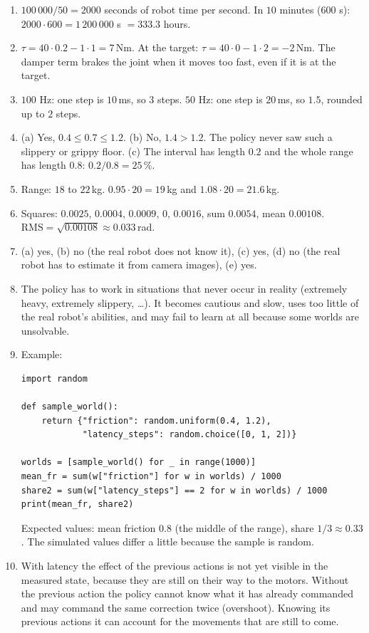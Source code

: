 \begin{enumerate}[label=\textbf{\ansnum.\arabic*}]
  \item $100\,000/50=2000$ seconds of robot time per second. In $10$ minutes ($600$ s): $2000\cdot600=1\,200\,000$ s $=333.3$ hours.
  \item $\tau=40\cdot0.2-1\cdot1=7$\,Nm. At the target: $\tau=40\cdot0-1\cdot2=-2$\,Nm. The damper term brakes the joint when it moves too fast, even if it is at the target.
  \item $100$ Hz: one step is $10$\,ms, so $3$ steps. $50$ Hz: one step is $20$\,ms, so $1.5$, rounded up to $2$ steps.
  \item (a) Yes, $0.4\le0.7\le1.2$. (b) No, $1.4>1.2$. The policy never saw such a slippery or grippy floor. (c) The interval has length $0.2$ and the whole range has length $0.8$: $0.2/0.8=25\,\%$.
  \item Range: $18$ to $22$\,kg. $0.95\cdot20=19$\,kg and $1.08\cdot20=21.6$\,kg.
  \item Squares: $0.0025,\,0.0004,\,0.0009,\,0,\,0.0016$, sum $0.0054$, mean $0.00108$. $\text{RMS}=\sqrt{0.00108}\approx0.033$\,rad.
  \item (a) yes, (b) no (the real robot does not know it), (c) yes, (d) no (the real robot has to estimate it from camera images), (e) yes.
  \item The policy has to work in situations that never occur in reality (extremely heavy, extremely slippery, \dots). It becomes cautious and slow, uses too little of the real robot's abilities, and may fail to learn at all because some worlds are unsolvable.
  \item[\textbf{\ansnum.9}] Example:
\begin{verbatim}
import random

def sample_world():
    return {"friction": random.uniform(0.4, 1.2),
            "latency_steps": random.choice([0, 1, 2])}

worlds = [sample_world() for _ in range(1000)]
mean_fr = sum(w["friction"] for w in worlds) / 1000
share2 = sum(w["latency_steps"] == 2 for w in worlds) / 1000
print(mean_fr, share2)
\end{verbatim}
  Expected values: mean friction $0.8$ (the middle of the range), share $1/3\approx0.33$. The simulated values differ a little because the sample is random.
  \item[\textbf{\ansnum.10}] With latency the effect of the previous actions is not yet visible in the measured state, because they are still on their way to the motors. Without the previous action the policy cannot know what it has already commanded and may command the same correction twice (overshoot). Knowing its previous actions it can account for the movements that are still to come.
\end{enumerate}
